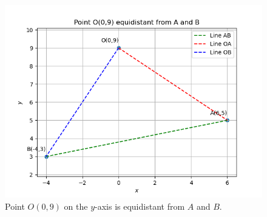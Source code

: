 \documentclass[journal]{IEEEtran}
\begin{document}
\begin{figure}[H]
 \begin{center}
  \includegraphics[width=0.75\columnwidth]{figs/equidistant_point.png}
 \end{center}
\caption{Point $O(0,9)$ on the $y$-axis is equidistant from $A$ and $B$.}
\label{fig}
\end{figure}
\end{document}
